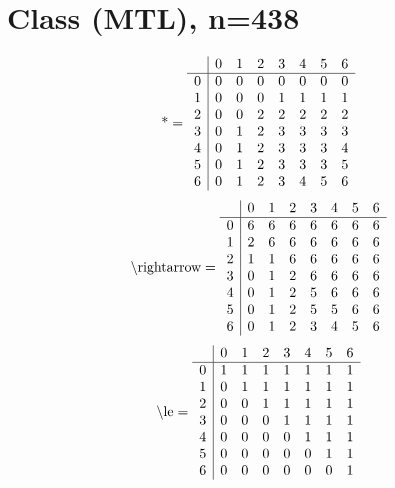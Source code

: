 \documentclass[11pt]{article}
\begin{document}
\section{Class (MTL), n=438}
\[\text{*} = 
\begin{array}{r | r r r r r r r}
 & 0 & 1 & 2 & 3 & 4 & 5 & 6 \\ \hline
0 & 0 & 0 & 0 & 0 & 0 & 0 & 0 \\
1 & 0 & 0 & 0 & 1 & 1 & 1 & 1 \\
2 & 0 & 0 & 2 & 2 & 2 & 2 & 2 \\
3 & 0 & 1 & 2 & 3 & 3 & 3 & 3 \\
4 & 0 & 1 & 2 & 3 & 3 & 3 & 4 \\
5 & 0 & 1 & 2 & 3 & 3 & 3 & 5 \\
6 & 0 & 1 & 2 & 3 & 4 & 5 & 6 \\
\end{array}
\]
\[\text{\textbackslash rightarrow} = 
\begin{array}{r | r r r r r r r}
 & 0 & 1 & 2 & 3 & 4 & 5 & 6 \\ \hline
0 & 6 & 6 & 6 & 6 & 6 & 6 & 6 \\
1 & 2 & 6 & 6 & 6 & 6 & 6 & 6 \\
2 & 1 & 1 & 6 & 6 & 6 & 6 & 6 \\
3 & 0 & 1 & 2 & 6 & 6 & 6 & 6 \\
4 & 0 & 1 & 2 & 5 & 6 & 6 & 6 \\
5 & 0 & 1 & 2 & 5 & 5 & 6 & 6 \\
6 & 0 & 1 & 2 & 3 & 4 & 5 & 6 \\
\end{array}
\]
\[\text{\textbackslash le} = 
\begin{array}{r | r r r r r r r}
 & 0 & 1 & 2 & 3 & 4 & 5 & 6 \\ \hline
0 & 1 & 1 & 1 & 1 & 1 & 1 & 1 \\
1 & 0 & 1 & 1 & 1 & 1 & 1 & 1 \\
2 & 0 & 0 & 1 & 1 & 1 & 1 & 1 \\
3 & 0 & 0 & 0 & 1 & 1 & 1 & 1 \\
4 & 0 & 0 & 0 & 0 & 1 & 1 & 1 \\
5 & 0 & 0 & 0 & 0 & 0 & 1 & 1 \\
6 & 0 & 0 & 0 & 0 & 0 & 0 & 1 \\
\end{array}
\]
\end{document}
